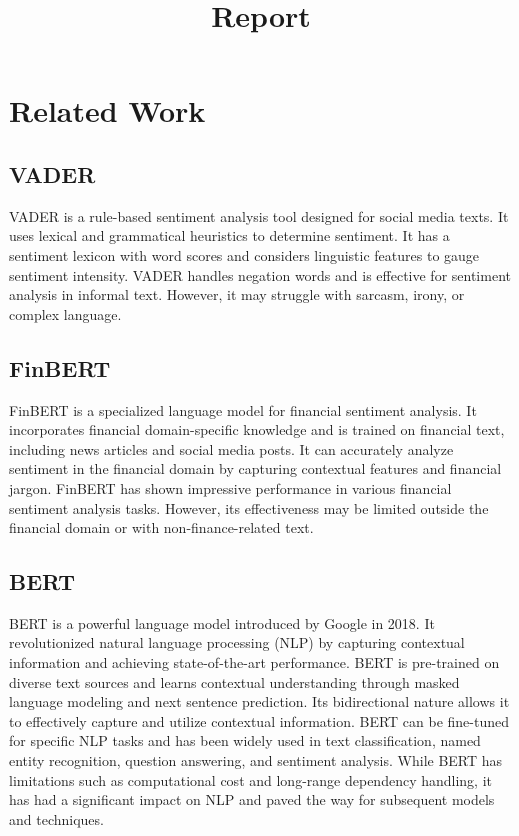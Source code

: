 
\title{Report}
\section{Related Work}
\subsection{VADER}
VADER is a rule-based sentiment analysis tool designed for social media texts. It uses lexical and grammatical heuristics to determine sentiment. It has a sentiment lexicon with word scores and considers linguistic features to gauge sentiment intensity. VADER handles negation words and is effective for sentiment analysis in informal text. However, it may struggle with sarcasm, irony, or complex language.
\subsection{FinBERT}
FinBERT is a specialized language model for financial sentiment analysis. It incorporates financial domain-specific knowledge and is trained on financial text, including news articles and social media posts. It can accurately analyze sentiment in the financial domain by capturing contextual features and financial jargon. FinBERT has shown impressive performance in various financial sentiment analysis tasks. However, its effectiveness may be limited outside the financial domain or with non-finance-related text.
\subsection{BERT}
BERT is a powerful language model introduced by Google in 2018. It revolutionized natural language processing (NLP) by capturing contextual information and achieving state-of-the-art performance. BERT is pre-trained on diverse text sources and learns contextual understanding through masked language modeling and next sentence prediction. Its bidirectional nature allows it to effectively capture and utilize contextual information. BERT can be fine-tuned for specific NLP tasks and has been widely used in text classification, named entity recognition, question answering, and sentiment analysis. While BERT has limitations such as computational cost and long-range dependency handling, it has had a significant impact on NLP and paved the way for subsequent models and techniques.
